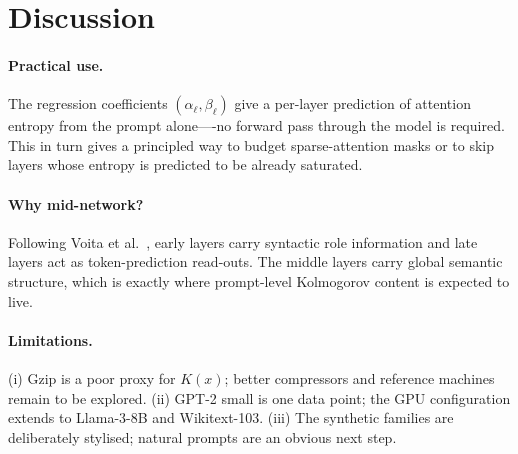 \section{Discussion}
\paragraph{Practical use.} The regression coefficients
$(\alpha_\ell, \beta_\ell)$ give a per-layer prediction of attention
entropy from the prompt alone—-no forward pass through the model is
required. This in turn gives a principled way to budget sparse-attention
masks or to skip layers whose entropy is predicted to be already saturated.

\paragraph{Why mid-network?}
Following Voita et al.~\cite{voita2019analyzing}, early layers carry
syntactic role information and late layers act as token-prediction
read-outs. The middle layers carry global semantic structure, which
is exactly where prompt-level Kolmogorov content is expected to live.

\paragraph{Limitations.}
(i) Gzip is a poor proxy for $K(x)$; better compressors and reference
machines remain to be explored. (ii) GPT-2 small is one data point;
the GPU configuration extends to Llama-3-8B and Wikitext-103.
(iii) The synthetic families are deliberately stylised; natural prompts
are an obvious next step.
